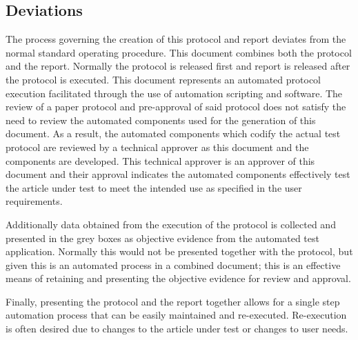 \subsection{Deviations}
The process governing the creation of this protocol and report deviates from the
normal standard operating procedure.  This document combines both the protocol
and the report.  Normally the protocol is released first and report is released
after the protocol is executed.  This document represents an automated protocol
execution facilitated through the use of automation scripting and software.  The
review of a paper protocol and pre-approval of said protocol does not satisfy
the need to review the automated components used for the generation of this
document.  As a result, the automated components which codify the actual test
protocol are reviewed by a technical approver as this document and the
components are developed.  This technical approver is an approver of this
document and their approval indicates the automated components effectively test 
the article under test to meet the intended use as specified in the user 
requirements.  

Additionally data obtained from the execution of the protocol is collected and
presented in the grey boxes as objective evidence from the automated test
application.  Normally this would not be presented together with the protocol,
but given this is an automated process in a combined document; this is an
effective means of retaining and presenting the objective evidence for review
and approval.

Finally, presenting the protocol and the report together allows for a single
step automation process that can be easily maintained and re-executed. Re-execution
is often desired due to changes to the article under test or changes to user needs.
